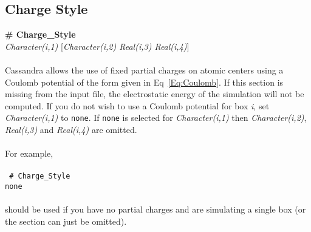 \subsection{Charge Style}\label{sec:Charge_Style}
{\bf \# Charge\_Style} \\
{\it Character(i,1)} [{\it Character(i,2) Real(i,3) Real(i,4)}] \\ \\
%
Cassandra allows the use of fixed partial charges on atomic centers
using a Coulomb potential of the form given in Eq~\ref{Eq:Coulomb}. 
If this section is missing from the input file, 
the electrostatic energy of the simulation will not be computed. 
If you do not wish to use a Coulomb potential for box {\em i},
set {\it Character(i,1)} to \texttt{none}. If \texttt{none} is
selected for {\it Character(i,1)} then {\it Character(i,2)}, 
{\it  Real(i,3)} and {\it Real(i,4)} are omitted.  
\\ \\
For example, \\ \\
\texttt{
\# Charge\_Style \\
none} 
\\ \\
should be used if you have no partial charges and are simulating a single box 
(or the section can just be omitted). 

